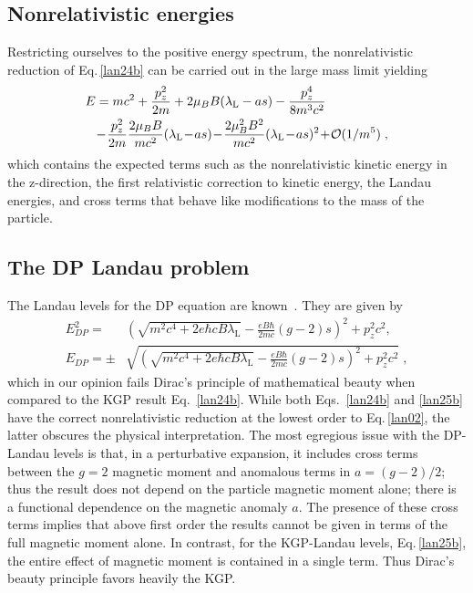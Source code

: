 \documentclass[epj]{svjour}
\begin{document}
\subsection{Nonrelativistic energies} \label{lannonrel}
Restricting ourselves to the positive energy spectrum, the nonrelativistic reduction of Eq.\,\eqref{lan24b} can be carried out in the large mass limit yielding
\begin{alignat}{1}
\label{lan27} E&=mc^{2}+\frac{p_{z}^{2}}{2m}+2\mu_{B}B(\lambda_\mathrm{L}-as)-\frac{p_{z}^{4}}{8m^{3}c^{2}}\\ \notag &\!-\!\frac{p_{z}^{2}}{2m}\frac{2\mu_{B}B}{mc^{2}}(\lambda_\mathrm{L}\!-\!as)\!-\!\frac{2\mu_{B}^{2}B^{2}}{mc^{2}}(\lambda_\mathrm{L}\!-\!as)^{2}\!+\!\mathcal{O}(1/m^{5})\;,\end{alignat}
which contains the expected terms such as the nonrelativistic kinetic energy in the z-direction, the first relativistic correction to kinetic energy, the Landau energies, and cross terms that behave like modifications to the mass of the particle.

\subsection{The DP Landau problem}\label{DPBhom}
The Landau levels for the DP equation are known~\cite{Tsai:1972iq}. They are given by
\begin{subequations}
\begin{alignat}{1}
\label{lan25} 
E^{2}_{DP} =&\left(\!\!\sqrt{\displaystyle m^{2}c^{4}\!+\!2e\hbar cB\lambda_\mathrm{L}}-\frac{eB\hbar}{2mc}(g-2)s\!\right)^{2}\!\!\!+p_{z}^{\!\!2}c^{2},\\[0.4cm]
\label{lan25b}
E_{DP} =\pm &\sqrt{\!\left(\!\!\sqrt{\displaystyle m^{2}c^{4}+2e\hbar cB\lambda_\mathrm{L}}\!-\!\frac{eB\hbar}{2mc}(g-2)s\!\right)^{\!\!2}\!\!\!+p_{z}^{2}c^{2}}\;,
\end{alignat}
\end{subequations}
which in our opinion fails Dirac\rq s principle of mathematical beauty when compared to the KGP result Eq.~\eqref{lan24b}. While both Eqs.~\eqref{lan24b} and \eqref{lan25b} have the correct nonrelativistic reduction at the lowest order to Eq.\,\eqref{lan02}, the latter obscures the physical interpretation. The most egregious issue with the DP-Landau levels is that, in a perturbative expansion, it includes cross terms between the $g=2$ magnetic moment and anomalous terms in $a=(g-2)/2$; thus the result does not depend on the particle magnetic moment alone; there is a functional dependence on the magnetic anomaly $a$. The presence of these cross terms implies that above first order the results cannot be given in terms of the full magnetic moment alone. In contrast, for the KGP-Landau levels, Eq.\,\eqref{lan25b}, the entire effect of magnetic moment is contained in a single term. Thus Dirac\rq s beauty principle favors heavily the KGP.
 
\end{document}
